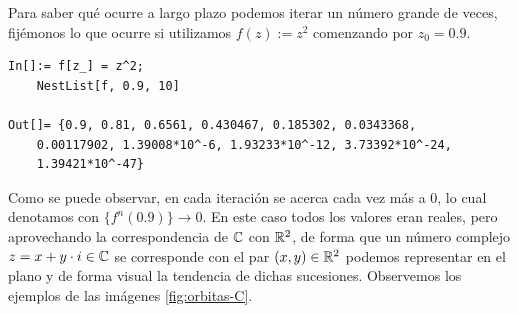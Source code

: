 Para saber qué ocurre a largo plazo podemos iterar un número grande de veces, fijémonos lo que ocurre si utilizamos $f(z):=z^2$ comenzando por $z_0=0.9$.

\begin{verbatim}
In[]:= f[z_] = z^2;
    NestList[f, 0.9, 10]
    
Out[]= {0.9, 0.81, 0.6561, 0.430467, 0.185302, 0.0343368,
    0.00117902, 1.39008*10^-6, 1.93233*10^-12, 3.73392*10^-24, 
    1.39421*10^-47}
\end{verbatim}

Como se puede observar, en cada iteración se acerca cada vez más a $0$, lo cual denotamos con $\{f^n(0.9)\}\rightarrow 0$. En este caso todos los valores eran reales, pero aprovechando la correspondencia de $\mathbb{C}$ con $\mathbb{R}^2$, de forma que un número complejo $z=x+y\cdot i\in\mathbb{C}$ se corresponde con el par $(x,y)\in\mathbb{R}^2$ podemos representar en el plano y de forma visual la tendencia de dichas sucesiones. Observemos los ejemplos de las imágenes \ref{fig:orbitas-C}.

